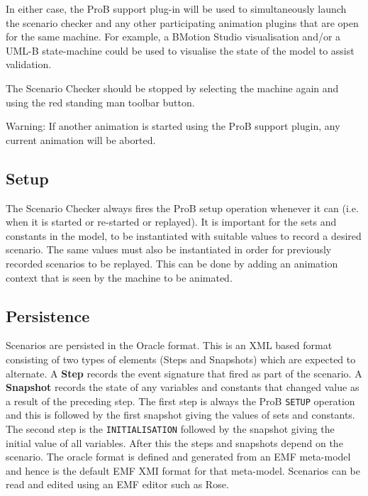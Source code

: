 In either case, the ProB support plug-in will be used to simultaneously launch the scenario checker and any other participating animation plugins that are open for  the same machine.
For example, a BMotion Studio visualisation and/or a UML-B state-machine could be used to visualise the state of the model to assist validation.

The Scenario Checker should be stopped by selecting the machine again and using the red standing man toolbar button.

Warning: If another animation is started using the ProB support plugin, any current animation will be aborted.

\subsection{Setup}
\label{sec:setup}

The Scenario Checker always fires the ProB setup operation whenever it can (i.e. when it is started or re-started or replayed).
It is important for the sets and constants in the model, to be instantiated with suitable values to record a desired scenario.
The same values must also be instantiated in order for previously recorded scenarios to be replayed.
This can be done by adding an animation context that is seen by the machine to be animated.

\subsection{Persistence}
\label{sec:persistence}

Scenarios are persisted in the Oracle format.
This is an XML based format consisting of two types of elements (Steps and Snapshots) which are expected to alternate.
A \textbf{Step} records the event signature that fired as part of the scenario.
A \textbf{Snapshot} records the state of any variables and constants that changed value as a result of the preceding step.
The first step is always the ProB \texttt{SETUP} operation and this is followed by the first snapshot giving the values of sets and constants.
The second step is the \texttt{INITIALISATION} followed by the snapshot giving the initial value of all variables.
After this the steps and snapshots depend on the scenario.
The oracle format is defined and generated from an EMF meta-model and hence is the default EMF XMI format for that meta-model.
Scenarios can be read and edited using an EMF editor such as Rose.


